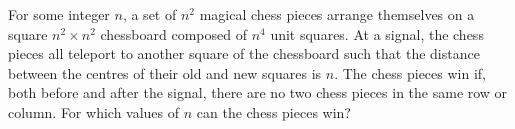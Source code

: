 For some integer $n$, a set of $n^2$ magical chess pieces arrange themselves on a square $n^2 \times n^2$ chessboard composed of $n^4$ unit squares. At a signal, the chess pieces all teleport to another square of the chessboard such that the distance between the centres of their old and new squares is $n$. The chess pieces win if, both before and after the signal, there are no two chess pieces in the same row or column. For which values of $n$ can the chess pieces win?